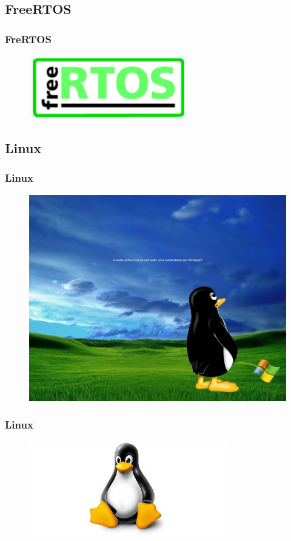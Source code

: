 \documentclass[spanish]{beamer}
\begin{document}
\subsection{FreeRTOS}
\begin{frame}
	\frametitle{FreRTOS}
	\begin{figure}
		\centering
		\includegraphics[width=0.7\linewidth]{../Resumen/freertos}
	\end{figure}
\end{frame}

\subsection{Linux}
\begin{frame}
	\frametitle{Linux}
	\begin{figure}
		\centering
		\includegraphics[width=0.7\linewidth]{tux_pee_windows}
	\end{figure}
\end{frame}

\begin{frame}
	\frametitle{Linux}
	\begin{figure}
		\centering
		\includegraphics[width=0.7\linewidth]{linux}
	\end{figure}
\end{frame}
\end{document}
